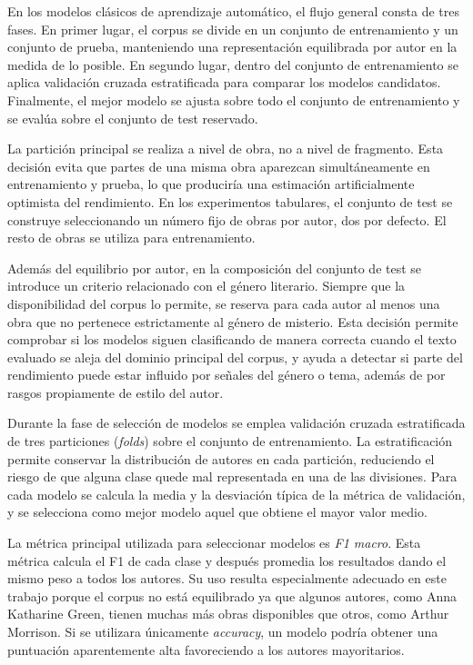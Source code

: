 \documentclass[IB]{TFUOC}%
\begin{document}
En los modelos clásicos de aprendizaje automático, el flujo general consta de tres fases. En primer lugar, el corpus se divide en un conjunto de entrenamiento y un conjunto de prueba, manteniendo una representación equilibrada por autor en la medida de lo posible. En segundo lugar, dentro del conjunto de entrenamiento se aplica validación cruzada estratificada para comparar los modelos candidatos. Finalmente, el mejor modelo se ajusta sobre todo el conjunto de entrenamiento y se evalúa sobre el conjunto de test reservado.

La partición principal se realiza a nivel de obra, no a nivel de fragmento. Esta decisión evita que partes de una misma obra aparezcan simultáneamente en entrenamiento y prueba, lo que produciría una estimación artificialmente optimista del rendimiento. En los experimentos tabulares, el conjunto de test se construye seleccionando un número fijo de obras por autor, dos por defecto. El resto de obras se utiliza para entrenamiento.

Además del equilibrio por autor, en la composición del conjunto de test se introduce un criterio relacionado con el género literario. Siempre que la disponibilidad del corpus lo permite, se reserva para cada autor al menos una obra que no pertenece estrictamente al género de misterio. Esta decisión permite comprobar si los modelos siguen clasificando de manera correcta cuando el texto evaluado se aleja del dominio principal del corpus, y ayuda a detectar si parte del rendimiento puede estar influido por señales del género o tema, además de por rasgos propiamente de estilo del autor.

Durante la fase de selección de modelos se emplea validación cruzada estratificada de tres particiones (\textit{folds}) sobre el conjunto de entrenamiento. La estratificación permite conservar la distribución de autores en cada partición, reduciendo el riesgo de que alguna clase quede mal representada en una de las divisiones. Para cada modelo se calcula la media y la desviación típica de la métrica de validación, y se selecciona como mejor modelo aquel que obtiene el mayor valor medio.

La métrica principal utilizada para seleccionar modelos es \textit{F1 macro}. Esta métrica calcula el F1 de cada clase y después promedia los resultados dando el mismo peso a todos los autores. Su uso resulta especialmente adecuado en este trabajo porque el corpus no está equilibrado ya que algunos autores, como Anna Katharine Green, tienen muchas más obras disponibles que otros, como Arthur Morrison. Si se utilizara únicamente \textit{accuracy}, un modelo podría obtener una puntuación aparentemente alta favoreciendo a los autores mayoritarios.
\end{document}
